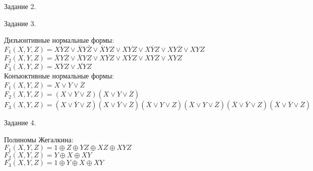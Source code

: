 \documentclass[a4paper,12pt]{report} %
\begin{document}
\bigskip


\begin{center}
Задание  2.\\
\end{center}

\begin{flushleft}


\end{flushleft}

\bigskip

       
\begin{center}
Задание 3.
\end{center}

\begin{flushleft}
Дизъюнтивные нормальные формы:\\
$F_1(X,Y,Z)=\overline{XYZ} \vee \overline{X}Y\bar{Z} \vee \overline{X}YZ \vee X\overline{YZ} \vee X\overline{Y}Z \vee XY\overline{Z} \vee XYZ$\\
$F_2(X,Y,Z)=\overline{X}Y\overline{Z} \vee \overline{X}YZ \vee X\overline{YZ} \vee X\overline{Y}Z \vee XY\overline{Z} \vee XYZ$\\
$F_3(X,Y,Z)=\overline{XYZ} \vee \overline{XY}Z$\\
\bigskip
Конъюктивные нормальные формы:\\
$F_1(X,Y,Z)=X \vee Y \vee \overline{Z}$\\
$F_2(X,Y,Z)=(X\vee Y\vee Z)(X\vee Y\vee\overline{Z})$\\
$F_3(X,Y,Z)=(X\vee \overline{Y}\vee Z)(X \vee \overline{Y} \vee \overline{Z})(\overline{X} \vee Y \vee Z)(\overline{X} \vee Y \vee \overline{Z})(\overline{X} \vee \overline{Y} \vee Z)(\overline{X} \vee \overline{Y} \vee \overline{Z})$\\
\end{flushleft}

\bigskip


\begin{center}
Задание 4.\\
\end{center}

\begin{flushleft}
Полиномы Жегалкина:\\
$F_1(X,Y,Z)=1 \oplus Z \oplus YZ \oplus XZ \oplus XYZ$\\
$F_2(X,Y,Z)=Y \oplus X \oplus XY$\\
$F_3(X,Y,Z)=1 \oplus Y \oplus X \oplus XY$\\
\end{flushleft}
\end{document}
